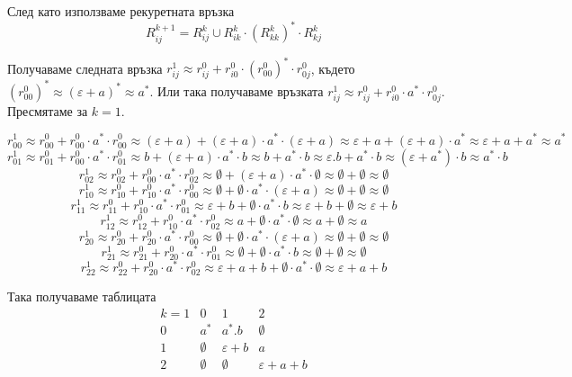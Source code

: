 \documentclass[12pt]{article}
\begin{document}
След като използваме рекуретната връзка \[R_{ij}^{k + 1} = R_{ij}^k \cup R_{ik}^k \cdot (R_{kk}^k)^* \cdot R_{kj}^k\]

Получаваме следната връзка \(r_{ij}^{1} \approx r_{ij}^0 + r_{i0}^0 \cdot (r_{00}^0)^* \cdot r_{0j}^0\), където \((r_{00}^0)^* \approx (\varepsilon + a)^* \approx a^*\). Или така получаваме връзката \(r_{ij}^{1} \approx r_{ij}^0 + r_{i0}^0 \cdot a^* \cdot r_{0j}^0\). Пресмятаме за \(k = 1\).

\[r_{00}^{1} \approx r_{00}^0 + r_{00}^0 \cdot a^* \cdot r_{00}^0 \approx (\varepsilon + a) + (\varepsilon + a) \cdot a^* \cdot (\varepsilon + a) \approx \varepsilon + a + (\varepsilon + a) \cdot a^* \approx \varepsilon + a + a^* \approx a^* \]
\[r_{01}^{1} \approx r_{01}^0 + r_{00}^0 \cdot a^* \cdot r_{01}^0 \approx b + (\varepsilon + a) \cdot a^* \cdot b \approx b + a^* \cdot b \approx
\varepsilon.b + a^* \cdot b \approx (\varepsilon + a^*) \cdot b \approx a^* \cdot b\]
\[r_{02}^{1} \approx r_{02}^0 + r_{00}^0 \cdot a^* \cdot r_{02}^0 \approx \emptyset + (\varepsilon + a) \cdot a^* \cdot \emptyset \approx \emptyset + \emptyset \approx \emptyset\]
\[r_{10}^{1} \approx r_{10}^0 + r_{10}^0 \cdot a^* \cdot r_{00}^0 \approx \emptyset + \emptyset \cdot a^* \cdot (\varepsilon + a) \approx \emptyset + \emptyset \approx \emptyset\]
\[r_{11}^{1} \approx r_{11}^0 + r_{10}^0 \cdot a^* \cdot r_{01}^0 \approx
\varepsilon + b + \emptyset \cdot a^* \cdot b \approx \varepsilon + b + \emptyset \approx \varepsilon + b\]
\[r_{12}^{1} \approx r_{12}^0 + r_{10}^0 \cdot a^* \cdot r_{02}^0 \approx
a + \emptyset \cdot a^* \cdot \emptyset \approx a + \emptyset \approx a\]
\[r_{20}^{1} \approx r_{20}^0 + r_{20}^0 \cdot a^* \cdot r_{00}^0 \approx
\emptyset + \emptyset \cdot a^* \cdot (\varepsilon + a) \approx \emptyset + \emptyset \approx \emptyset\]
\[r_{21}^{1} \approx r_{21}^0 + r_{20}^0 \cdot a^* \cdot r_{01}^0 \approx
\emptyset + \emptyset \cdot  a^* \cdot b \approx \emptyset + \emptyset \approx \emptyset\]
\[r_{22}^{1} \approx r_{22}^0 + r_{20}^0 \cdot a^* \cdot r_{02}^0 \approx
\varepsilon + a + b  + \emptyset \cdot  a^* \cdot \emptyset \approx \varepsilon + a + b\]

Така получаваме таблицата
\[\begin{array}{c|ccc}
k = 1 & 0 & 1   & 2     \\ \hline
0   & a^* & a^*.b & \emptyset \\
1   & \emptyset & \varepsilon + b & a \\
2   & \emptyset & \emptyset & \varepsilon + a + b 
\end{array}\]
\end{document}
